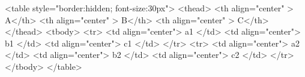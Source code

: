             <table style="border:hidden; font-size:30px">
                <thead>
                    <th align="center" > A</th>
                    <th align="center" > B</th>
                    <th align="center" > C</th>
                </thead>  
                <tbody>
                  <tr>
                    <td align="center"> a1 </td>
                    <td align="center"> b1 </td>
                    <td align="center"> c1 </td>
                  </tr>
                  <tr>
                    <td align="center"> a2 </td>
                    <td align="center"> b2 </td>
                    <td align="center"> c2 </td>
                  </tr>
                </tbody>
            </table> 
